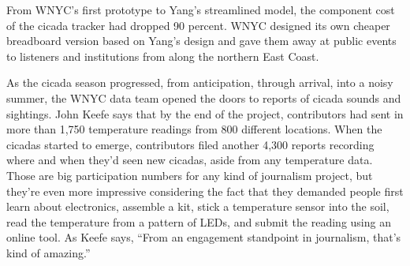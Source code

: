 From WNYC's first prototype to Yang's streamlined model, the component
cost of the cicada tracker had dropped 90 percent. WNYC designed
its own cheaper breadboard version based on Yang's design and gave them
away at public events to listeners and institutions from along the northern
East Coast.

As the cicada season progressed, from anticipation, through arrival, into a
noisy summer, the WNYC data team opened the doors to reports of cicada
sounds and sightings. John Keefe says that by the end of the project, contributors
had sent in more than 1,750 temperature readings from 800 different
locations. When the cicadas started to emerge, contributors filed another
4,300 reports recording where and when they'd seen new cicadas, aside
from any temperature data. Those are big participation numbers for any
kind of journalism project, but they're even more impressive considering
the fact that they demanded people first learn about electronics, assemble
a kit, stick a temperature sensor into the soil, read the temperature from a
pattern of LEDs, and submit the reading using an online tool. As Keefe says,
``From an engagement standpoint in journalism, that's kind of amazing.''

